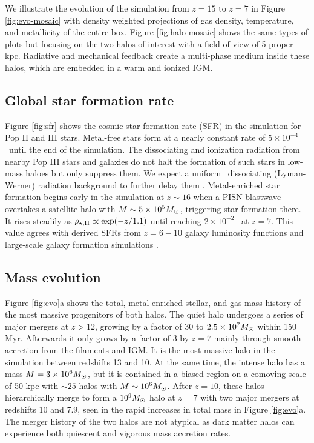 \documentclass[apjl]{emulateapj}
\begin{document}
We illustrate the evolution of the simulation from $z=15$ to $z=7$ in
Figure \ref{fig:evo-mosaic} with density weighted projections of gas
density, temperature, and metallicity of the entire box.  Figure
\ref{fig:halo-mosaic} shows the same types of plots but focusing on
the two halos of interest with a field of view of 5 proper kpc.
Radiative and mechanical feedback create a multi-phase medium inside
these halos, which are embedded in a warm and ionized IGM.

\subsection{Global star formation rate}

Figure \ref{fig:sfr} shows the cosmic star formation rate (SFR) in the
simulation for Pop II and III stars.  Metal-free stars form at a
nearly constant rate of $5 \times 10^{-4}$ \sfr~until the end of the
simulation.  The dissociating and ionization radiation from nearby Pop
III stars and galaxies do not halt the formation of such stars in
low-mass haloes but only suppress them.  We expect a uniform
\hh~dissociating (Lyman-Werner) radiation background to further delay
them \citep{Machacek01, Wise07, OShea08}.  Metal-enriched star
formation begins early in the simulation at $z \sim 16$ when a PISN
blastwave overtakes a satellite halo with $M \sim 5 \times 10^5 \Ms$,
triggering star formation there.  It rises steadily as
$\rho_{\rm {\star,II}} \propto \exp(-z/1.1)$ until reaching $2 \times
10^{-2}$ \sfr~at $z=7$.  This value agrees with derived SFRs from
$z=6-10$ galaxy luminosity functions \citep[e.g.][]{Bouwens10} and
large-scale galaxy formation simulations \citep[e.g.][]{Schaye10}.

\subsection{Mass evolution}
\label{sec:halo}


Figure \ref{fig:evo}a shows the total, metal-enriched stellar, and gas
mass history of the most massive progenitors of both halos.  The quiet
halo undergoes a series of major mergers at $z > 12$, growing by a
factor of 30 to $2.5 \times 10^7 \Ms$ within 150 Myr.  Afterwards it
only grows by a factor of 3 by $z=7$ mainly through smooth accretion
from the filaments and IGM.  It is the most massive halo in the
simulation between redshifts 13 and 10.  At the same time, the intense
halo has a mass $M = 3 \times 10^6 \Ms$, but it is contained in a
biased region on a comoving scale of 50 kpc with $\sim25$ halos with
$M \sim 10^6 \Ms$.  After $z=10$, these halos hierarchically merge to
form a $10^9 \Ms$ halo at $z=7$ with two major mergers at redshifts 10
and 7.9, seen in the rapid increases in total mass in Figure
\ref{fig:evo}a.  The merger history of the two halos are not atypical
as dark matter halos can experience both quiescent and vigorous mass
accretion rates.
\end{document}
